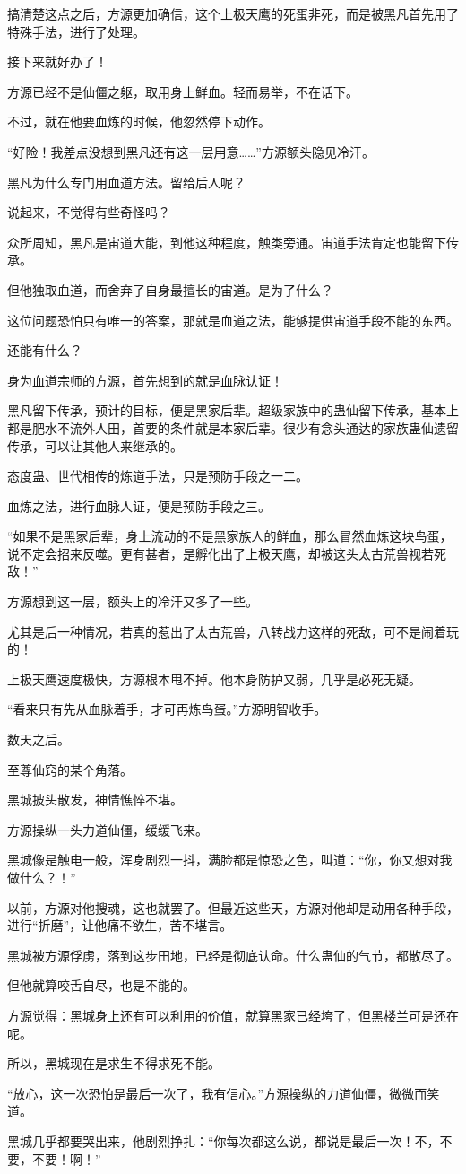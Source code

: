 \begin{this_body}
搞清楚这点之后，方源更加确信，这个上极天鹰的死蛋非死，而是被黑凡首先用了特殊手法，进行了处理。

接下来就好办了！

方源已经不是仙僵之躯，取用身上鲜血。轻而易举，不在话下。

不过，就在他要血炼的时候，他忽然停下动作。

“好险！我差点没想到黑凡还有这一层用意……”方源额头隐见冷汗。

黑凡为什么专门用血道方法。留给后人呢？

说起来，不觉得有些奇怪吗？

众所周知，黑凡是宙道大能，到他这种程度，触类旁通。宙道手法肯定也能留下传承。

但他独取血道，而舍弃了自身最擅长的宙道。是为了什么？

这位问题恐怕只有唯一的答案，那就是血道之法，能够提供宙道手段不能的东西。

还能有什么？

身为血道宗师的方源，首先想到的就是血脉认证！

黑凡留下传承，预计的目标，便是黑家后辈。超级家族中的蛊仙留下传承，基本上都是肥水不流外人田，首要的条件就是本家后辈。很少有念头通达的家族蛊仙遗留传承，可以让其他人来继承的。

态度蛊、世代相传的炼道手法，只是预防手段之一二。

血炼之法，进行血脉人证，便是预防手段之三。

“如果不是黑家后辈，身上流动的不是黑家族人的鲜血，那么冒然血炼这块鸟蛋，说不定会招来反噬。更有甚者，是孵化出了上极天鹰，却被这头太古荒兽视若死敌！”

方源想到这一层，额头上的冷汗又多了一些。

尤其是后一种情况，若真的惹出了太古荒兽，八转战力这样的死敌，可不是闹着玩的！

上极天鹰速度极快，方源根本甩不掉。他本身防护又弱，几乎是必死无疑。

“看来只有先从血脉着手，才可再炼鸟蛋。”方源明智收手。

数天之后。

至尊仙窍的某个角落。

黑城披头散发，神情憔悴不堪。

方源操纵一头力道仙僵，缓缓飞来。

黑城像是触电一般，浑身剧烈一抖，满脸都是惊恐之色，叫道：“你，你又想对我做什么？！”

以前，方源对他搜魂，这也就罢了。但最近这些天，方源对他却是动用各种手段，进行“折磨”，让他痛不欲生，苦不堪言。

黑城被方源俘虏，落到这步田地，已经是彻底认命。什么蛊仙的气节，都散尽了。

但他就算咬舌自尽，也是不能的。

方源觉得：黑城身上还有可以利用的价值，就算黑家已经垮了，但黑楼兰可是还在呢。

所以，黑城现在是求生不得求死不能。

“放心，这一次恐怕是最后一次了，我有信心。”方源操纵的力道仙僵，微微而笑道。

黑城几乎都要哭出来，他剧烈挣扎：“你每次都这么说，都说是最后一次！不，不要，不要！啊！”

\end{this_body}

